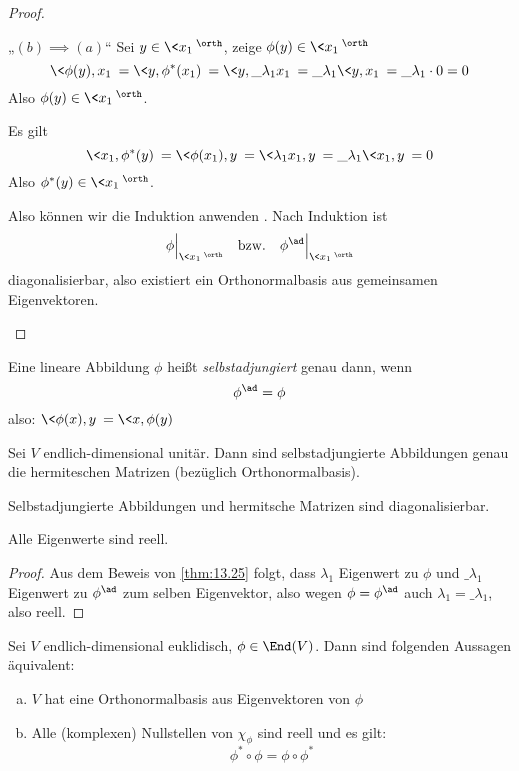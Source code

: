 \documentclass{mycourse}
\begin{document}
\begin{thm}
\begin{proof}
\begin{seg}{„$(b)\implies (a)$“}
			Sei $y\in \<x_1\>^\orth$, zeige $\phi(y)\in \<x_1\>^\orth$
			\[
				\<\phi(y),x_1\> = \<y,\phi^*(x_1)\> = \<y,\_\lambda_1x_1\> = \_\lambda_1 \<y,x_1\> = \_\lambda_1 \cdot 0 = 0
			\]
			Also $\phi(y) \in \<x_1\>^\orth$.

			Es gilt
			\[
				\<x_1,\phi^*(y)\> = \<\phi(x_1),y\> = \<\lambda_1x_1,y\> = \_\lambda_1 \<x_1,y\> = 0
			\]
			Also $\phi^*(y) \in \<x_1\>^\orth$.

			Also können wir die Induktion anwenden .
			Nach Induktion ist
			\[
				\phi\Big|_{\<x_1\>^\orth} \quad \text{bzw.} \quad \phi^{\ad}\Big|_{\<x_1\>^\orth}
			\]
			diagonalisierbar, also existiert ein Orthonormalbasis aus gemeinsamen Eigenvektoren.
		\end{seg}
	\end{proof}
\end{thm}

\begin{df}
	\label{df:13.26}
	Eine lineare Abbildung $\phi$ heißt \emph{selbstadjungiert} genau dann, wenn
	\[
		\phi^{\ad} = \phi
	\]
	also: $\<\phi(x),y\> = \<x,\phi(y)\>$
\end{df}

\begin{kor}[Spektralsatz]
	\label{kor:13.27}
	Sei $V$ endlich-dimensional unitär.
	Dann sind selbstadjungierte Abbildungen genau die hermiteschen Matrizen (bezüglich Orthonormalbasis).

	Selbstadjungierte Abbildungen und hermitsche Matrizen sind diagonalisierbar.

	Alle Eigenwerte sind reell.
	\begin{proof}
		Aus dem Beweis von \ref{thm:13.25} folgt, dass $\lambda_1$ Eigenwert zu $\phi$ und $\_\lambda_1$ Eigenwert zu $\phi^{\ad}$ zum selben Eigenvektor, also wegen $\phi=\phi^{\ad}$ auch $\lambda_1 = \_\lambda_1$, also reell.

		\fixme[Rest?]
	\end{proof}
\end{kor}

\begin{kor}
	\label{kor:13.28}
	Sei $V$ endlich-dimensional euklidisch, $\phi\in \End(V)$.
	Dann sind folgenden Aussagen äquivalent:
	\begin{enumerate}[(a)]
		\item
			$V$ hat eine Orthonormalbasis aus Eigenvektoren von $\phi$
		\item
			Alle (komplexen) Nullstellen von $\chi_\phi$ sind reell und es gilt:
			\[
				\phi^*\circ \phi = \phi\circ \phi^*
			\]
	\end{enumerate}
\end{kor}
\end{document}
